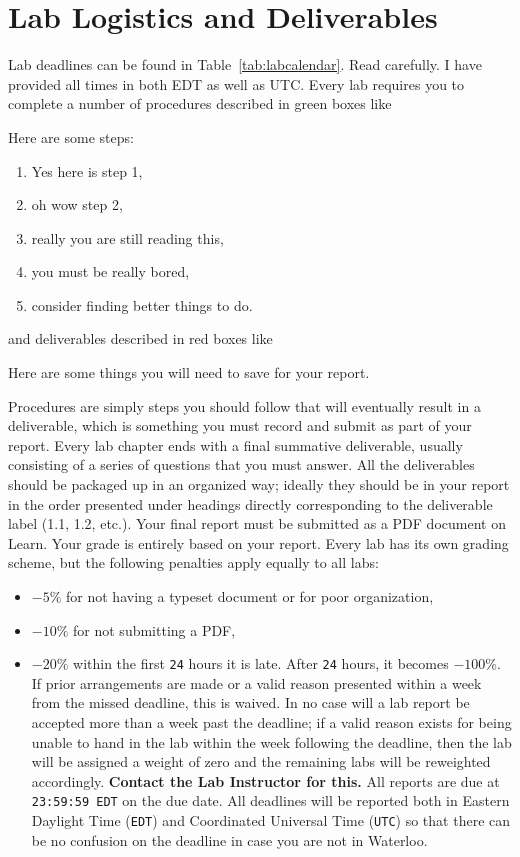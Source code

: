 \section{Lab Logistics and Deliverables}\label{intro:logistics}
Lab deadlines can be found in Table~\ref{tab:labcalendar}. Read carefully.
I have provided all times in both EDT as well as UTC.
Every lab requires you to complete a number of procedures described in
green boxes like
\begin{procedure}[]
  Here are some steps:
  \begin{enumerate}[label=(\arabic*)]
    \item{Yes here is step 1,}
    \item{oh wow step 2,}
    \item{really you are still reading this,}
    \item{you must be really bored,}
    \item{consider finding better things to do.}
  \end{enumerate}
\end{procedure}
\noindent
and deliverables described in red boxes like
\begin{deliverable}[]
  Here are some things you will need to save for your report.
\end{deliverable}
Procedures are simply steps you should follow that will eventually result in
a deliverable, which is something you must record and submit as part of your
report. Every lab chapter ends with a final summative deliverable, usually
consisting of a series of questions that you must answer.
%
All the deliverables should be packaged up in an organized way; ideally
they should be in your report in the order presented under headings directly
corresponding to the deliverable label (1.1, 1.2, etc.). Your final report
must be submitted as a PDF document on Learn. Your grade is entirely based
on your report. Every lab has its own grading scheme, but the following
penalties apply equally to all labs:
\begin{itemize}
  \item{
    \(-5\%\) for not having a typeset document or for poor organization,
  }
  \item{
    \(-10\%\) for not submitting a PDF,
  }
  \item{
    \(-20\%\) within the first \texttt{24} hours it is late. After
    \texttt{24} hours, it becomes \(-100\%.\) If prior arrangements are made
    or a valid reason presented within a week from the missed deadline, this
    is waived. In no case will a lab report be accepted more than a week past
    the deadline; if a valid reason exists for being unable to hand in the lab
    within the week following the deadline, then the lab will be assigned a
    weight of zero and the remaining labs will be reweighted accordingly.
    \textbf{Contact the Lab Instructor for this.}
    All reports are due at \texttt{23:59:59 EDT} on the due date.
    All deadlines will be reported both
    in Eastern Daylight Time (\texttt{EDT}) and Coordinated Universal Time
    (\texttt{UTC})
    so that there can be no confusion on the deadline in case you are not
    in Waterloo.
  }
\end{itemize}
